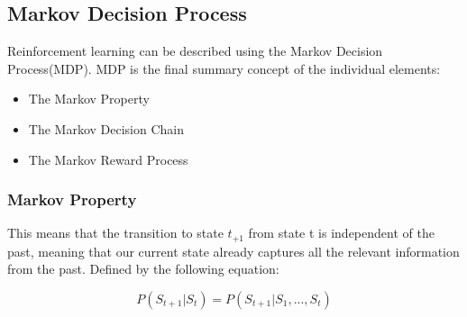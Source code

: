  \subsection{Markov Decision Process}
 Reinforcement learning can be described using the Markov Decision Process(MDP). MDP is the final summary concept of the individual elements:
 \begin{itemize}
 \item The Markov Property 
 \item The Markov Decision Chain
 \item The Markov Reward Process
 \end{itemize}
 \subsubsection*{Markov Property}
 This means that the transition to state $t_{+1}$ from state {t} is independent of the past, meaning that our current state already captures all the relevant information from the past.
 Defined by the following equation:

 \begingroup
 \Large
 \begin{equation*}
 P(S_{t+1}|S_t) = P(S_{t+1}|S_1,...,S_t)
 \end{equation*}
 \endgroup
